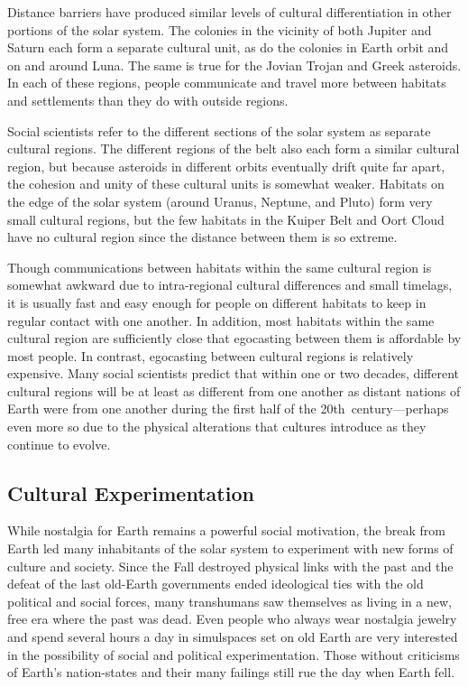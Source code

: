 Distance barriers have produced similar levels of 
cultural differentiation in other portions of the solar 
system. The colonies in the vicinity of both Jupiter 
and Saturn each form a separate cultural unit, as do 
the colonies in Earth orbit and on and around Luna. 
The same is true for the Jovian Trojan and Greek asteroids. In each of these regions, people communicate 
and travel more between habitats and settlements 
than they do with outside regions.

Social scientists refer to the different sections of the 
solar system as separate cultural regions. The different 
regions of the belt also each form a similar cultural 
region, but because asteroids in different orbits eventually drift quite far apart, the cohesion and unity of 
these cultural units is somewhat weaker. Habitats on 
the edge of the solar system (around Uranus, Neptune, 
and Pluto) form very small cultural regions, but the 
few habitats in the Kuiper Belt and Oort Cloud have 
no cultural region since the distance between them is 
so extreme.

Though communications between habitats within 
the same cultural region is somewhat awkward due 
to intra-regional cultural differences and small timelags, it is usually fast and easy enough for people on 
different habitats to keep in regular contact with one 
another. In addition, most habitats within the same 
cultural region are sufficiently close that egocasting 
between them is affordable by most people. In contrast, egocasting between cultural regions is relatively 
expensive. Many social scientists predict that within 
one or two decades, different cultural regions will be 
at least as different from one another as distant nations of Earth were from one another during the first 
half of the 20th century—perhaps even more so due 
to the physical alterations that cultures introduce as 
they continue to evolve.

\subsection{Cultural Experimentation}

While nostalgia for Earth remains a powerful social 
motivation, the break from Earth led many inhabitants of the solar system to experiment with new 
forms of culture and society. Since the Fall destroyed 
physical links with the past and the defeat of the last 
old-Earth governments ended ideological ties with the 
old political and social forces, many transhumans saw 
themselves as living in a new, free era where the past 
was dead. Even people who always wear nostalgia 
jewelry and spend several hours a day in simulspaces 
set on old Earth are very interested in the possibility 
of social and political experimentation. Those without 
criticisms of Earth's nation-states and their many failings still rue the day when Earth fell.

